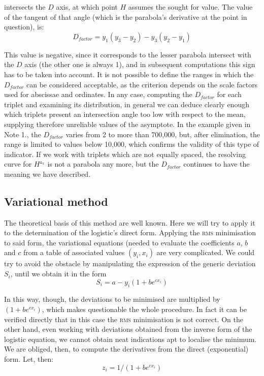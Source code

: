 \documentclass[%
 aip,
 jmp,%
 amsmath,amssymb,
 reprint,%
]{revtex4-1}
\begin{document}
intersects the $D$ axis, at which point $H$ assumes the sought for value. The value of the tangent of that angle (which is the parabola's derivative at the point in question), is:
	\[D_{factor} = y_1 (y_3 - y_2) - y_3 (y_2 - y_1)\]

This value is negative, since it corresponds to the lesser parabola intersect with the $D$ axis (the other one is always 1), and in subsequent computations this sign has to be taken into account.
It is not possible to define the ranges in which the $D_{factor}$ can be considered acceptable, as the criterion  depends on the scale factors used for abscissae and ordinates.  In any case, computing the $D_{factor}$ for each  triplet and  examining  its distribution, in general we can deduce clearly enough which triplets present an intersection angle too low with respect to the mean, supplying therefore unreliable values of the asymptote.
In the example given in Note 1., the $D_{factor}$ varies from 2 to more than 700,000, but, after elimination, the  range is limited to values below 10,000, which confirms the validity of this type of indicator.
If we work with  triplets which are not equally spaced, the  resolving curve for $H^{\vartriangle_x}$ is not a parabola any more, but the $D_{factor}$ continues to have the meaning we have described.


\subsection{\label{sec:level2}Variational method}

The theoretical basis of this method are well known. Here we will try to apply it to the determination of the logistic's direct form. Applying the \textsc{rms} minimisation to said form, the variational equations (needed  to evaluate the coefficients $a$, $b$ and $c$ from a table of associated values $(y_i, x_i)$  are very complicated.
We could try to avoid the obstacle by manipulating the expression of the generic deviation $S_i$, until we obtain it in the form
 \[S_i = a - y_i (1 + b e^{cx_i}) \]

In this way, though, the deviations to be minimised are multiplied by $(1 + b e^{cx_i})$, which makes questionable the whole procedure. In fact it can be verified directly that in this case the \textsc{rms} minimisation is not correct. On the other hand, even working with deviations obtained from the inverse form of the logistic equation, we cannot obtain neat indications apt to localise the minimum. We are obliged, then, to compute the derivatives from the  direct (exponential) form.
Let, then:
\[z_i = 1 / (1 + b e^{cx_i})\]
\end{document}

